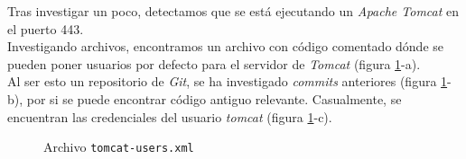 Tras investigar un poco, detectamos que se está ejecutando un \textit{Apache Tomcat} en el puerto 443.\\

Investigando archivos, encontramos un archivo con código comentado dónde se pueden poner usuarios por defecto para el servidor de \textit{Tomcat} (figura \ref{fig:seal-tomcat-users}-a).\\

Al ser esto un repositorio de \textit{Git}, se ha investigado \textit{commits} anteriores (figura \ref{fig:seal-tomcat-users}-b), por si se puede encontrar código antiguo relevante. Casualmente, se encuentran las credenciales del usuario \textit{tomcat} (figura \ref{fig:seal-tomcat-users}-c).\\

\begin{figure}
    \centering
    \qquad
    \qquad
    \caption{Archivo \texttt{tomcat-users.xml}}
    \label{fig:seal-tomcat-users}
\end{figure}

